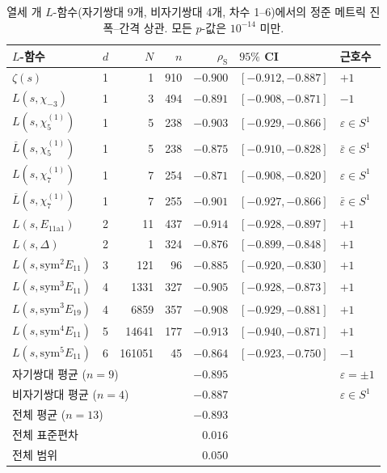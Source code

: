 \documentclass[11pt,a4paper]{article}
\theoremstyle{plain}
\theoremstyle{definition}
\begin{document}
\begin{table}[h]
\centering
\caption{열세 개 $L$-함수(자기쌍대 9개, 비자기쌍대 4개, 차수 1--6)에서의
정준 메트릭 진폭--간격 상관. 모든 $p$-값은 $10^{-14}$ 미만.}
\label{tab:canonical}
\small
\begin{tabular}{llrrrll}
\toprule
\textbf{$L$-함수} & $d$ & $N$ & $n$ &
$\rho_{\mathrm{S}}$ & \textbf{$95\%$ CI} & \textbf{근호수} \\
\midrule
$\zeta(s)$            & 1 & 1   & 910 & $-0.900$ & $[-0.912,-0.887]$ & $+1$ \\
$L(s,\chi_{-3})$      & 1 & 3   & 494 & $-0.891$ & $[-0.908,-0.871]$ & $-1$ \\
$L(s,\chi_{5}^{(1)})$ & 1 & 5   & 238 & $-0.903$ & $[-0.929,-0.866]$ & $\varepsilon \in S^1$ \\
$\overline{L}(s,\chi_{5}^{(1)})$ & 1 & 5 & 238 & $-0.875$ & $[-0.910,-0.828]$ & $\bar{\varepsilon} \in S^1$ \\
$L(s,\chi_{7}^{(1)})$ & 1 & 7   & 254 & $-0.871$ & $[-0.908,-0.820]$ & $\varepsilon \in S^1$ \\
$\overline{L}(s,\chi_{7}^{(1)})$ & 1 & 7 & 255 & $-0.901$ & $[-0.927,-0.866]$ & $\bar{\varepsilon} \in S^1$ \\
$L(s,E_{11\mathrm{a}1})$ & 2 & 11  & 437 & $-0.914$ & $[-0.928,-0.897]$ & $+1$ \\
$L(s,\Delta)$         & 2 & 1   & 324 & $-0.876$ & $[-0.899,-0.848]$ & $+1$ \\
$L(s,\mathrm{sym}^2 E_{11})$ & 3 & 121 & 96 & $-0.885$ & $[-0.920,-0.830]$ & $+1$ \\
$L(s,\mathrm{sym}^3 E_{11})$ & 4 & 1331 & 327 & $-0.905$ & $[-0.928,-0.873]$ & $+1$ \\
$L(s,\mathrm{sym}^3 E_{19})$ & 4 & 6859 & 357 & $-0.908$ & $[-0.929,-0.881]$ & $+1$ \\
$L(s,\mathrm{sym}^4 E_{11})$ & 5 & 14641 & 177 & $-0.913$ & $[-0.940,-0.871]$ & $+1$ \\
$L(s,\mathrm{sym}^5 E_{11})$ & 6 & 161051 & 45 & $-0.864$ & $[-0.923,-0.750]$ & $-1$ \\
\midrule
\multicolumn{3}{l}{자기쌍대 평균 ($n = 9$)} & & $-0.895$ & & $\varepsilon = \pm 1$ \\
\multicolumn{3}{l}{비자기쌍대 평균 ($n = 4$)} & & $-0.887$ & & $\varepsilon \in S^1$ \\
\multicolumn{3}{l}{전체 평균 ($n = 13$)} & & $-0.893$ & & \\
\multicolumn{3}{l}{전체 표준편차} & & $0.016$ & & \\
\multicolumn{3}{l}{전체 범위} & & $0.050$ & & \\
\bottomrule
\end{tabular}
\end{table}
\end{document}

